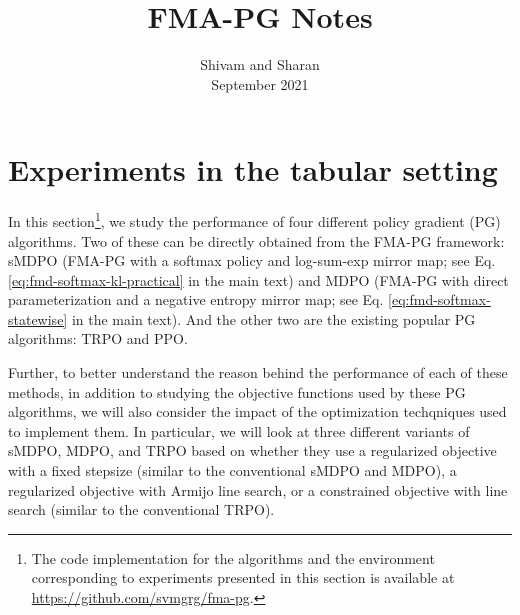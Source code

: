 \documentclass[a4paper, 10pt]{article}
\author{Shivam and Sharan
  \\ September 2021}
\date{}
\title{FMA-PG Notes}
\begin{document}
\maketitle
\vspace{-2cm}

\section{Experiments in the tabular setting} \label{app:tabular_experiments}
In this section\footnote{The code implementation for the algorithms and the environment corresponding to experiments presented in this section is available at \url{https://github.com/svmgrg/fma-pg}.}, we study the performance of four different policy gradient (PG) algorithms. Two of these can be directly obtained from the FMA-PG framework: sMDPO (FMA-PG with a softmax policy and log-sum-exp mirror map; see Eq. \ref{eq:fmd-softmax-kl-practical} in the main text) and MDPO (FMA-PG with direct parameterization and a negative entropy mirror map; see Eq. \ref{eq:fmd-softmax-statewise} in the main text). And the other two are the existing popular PG algorithms: TRPO and PPO. 

Further, to better understand the reason behind the performance of each of these methods, in addition to studying the objective functions used by these PG algorithms, we will also consider the impact of the optimization techqniques used to implement them. In particular, we will look at three different variants of sMDPO, MDPO, and TRPO based on whether they use a regularized objective with a fixed stepsize (similar to the conventional sMDPO and MDPO), a regularized objective with Armijo line search, or a constrained objective with line search (similar to the conventional TRPO). 
\end{document}
